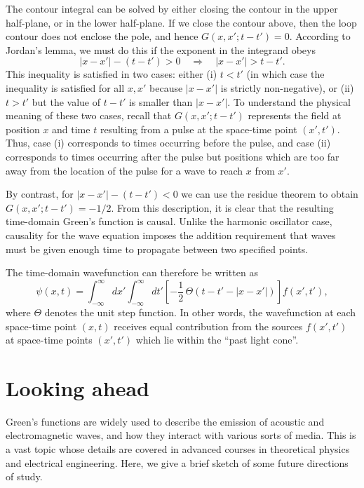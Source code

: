 \documentclass[10pt,a4paper]{article}
\begin{document}
The contour integral can be solved by either closing the contour in
the upper half-plane, or in the lower half-plane. If we close the
contour above, then the loop contour does not enclose the pole, and
hence $G(x,x';t-t') = 0$. According to Jordan's lemma, we must do this
if the exponent in the integrand obeys
\begin{equation}
  |x-x'| - (t-t') > 0  \quad \Rightarrow \quad |x-x'| > t-t'.
\end{equation}
This inequality is satisfied in two cases: either (i) $t < t'$ (in
which case the inequality is satisfied for all $x,x'$ because $|x-x'|$
is strictly non-negative), or (ii) $t > t'$ but the value of $t-t'$ is
smaller than $|x-x'|$. To understand the physical meaning of these two
cases, recall that $G(x,x';t-t')$ represents the field at position $x$
and time $t$ resulting from a pulse at the space-time point
$(x',t')$. Thus, case (i) corresponds to times occurring before the
pulse, and case (ii) corresponds to times occurring after the pulse
but positions which are too far away from the location of the pulse
for a wave to reach $x$ from $x'$.

By contrast, for $|x-x'| - (t-t') < 0$ we can use the residue theorem
to obtain $G(x,x';t-t') = -1/2$. From this description, it is clear
that the resulting time-domain Green's function is causal. Unlike the
harmonic oscillator case, causality for the wave equation imposes the
addition requirement that waves must be given enough time to propagate
between two specified points.

The time-domain wavefunction can therefore be written as
\begin{equation}
  \psi(x,t) = \int_{-\infty}^\infty dx' \int_{-\infty}^\infty dt'
  \left[-\frac{1}{2}\,\Theta(t-t' - |x-x'|)\right] f(x',t'),
\end{equation}
where $\Theta$ denotes the unit step function. In other words, the
wavefunction at each space-time point $(x,t)$ receives equal
contribution from the sources $f(x',t')$ at space-time points
$(x',t')$ which lie within the ``past light cone''.

\section{Looking ahead}

Green's functions are widely used to describe the emission of acoustic
and electromagnetic waves, and how they interact with various sorts of
media. This is a vast topic whose details are covered in advanced
courses in theoretical physics and electrical engineering. Here, we
give a brief sketch of some future directions of study.
\end{document}
